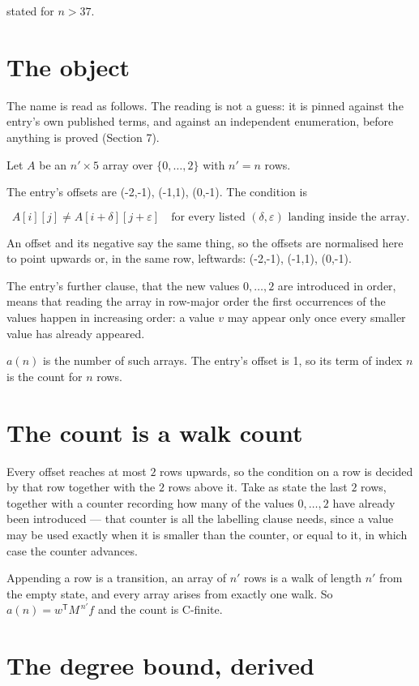 \documentclass[11pt]{article}
\theoremstyle{definition}
\begin{document}
stated for $n > 37$.

\section{The object}

The name is read as follows. The reading is not a guess: it is pinned against the entry's own published terms, and against an independent enumeration, before anything is proved (Section 7).

Let $A$ be an $n' \times 5$ array over $\{0,\dots,2\}$ with $n' = n$ rows.

The entry's offsets are (-2,-1), (-1,1), (0,-1). The condition is

\[A[i][j] \ne A[i{+}\delta][j{+}\varepsilon]\quad\text{for every listed }(\delta,\varepsilon)\text{ landing inside the array.}\]

An offset and its negative say the same thing, so the offsets are normalised here to point upwards or, in the same row, leftwards: (-2,-1), (-1,1), (0,-1).

The entry's further clause, that the new values $0,\dots,2$ are introduced in order, means that reading the array in row-major order the first occurrences of the values happen in increasing order: a value $v$ may appear only once every smaller value has already appeared.

$a(n)$ is the number of such arrays. The entry's offset is 1, so its term of index $n$ is the count for $n$ rows.

\section{The count is a walk count}

Every offset reaches at most $2$ rows upwards, so the condition on a row is decided by that row together with the $2$ rows above it. Take as state the last $2$ rows, together with a counter recording how many of the values $0,\dots,2$ have already been introduced --- that counter is all the labelling clause needs, since a value may be used exactly when it is smaller than the counter, or equal to it, in which case the counter advances.

Appending a row is a transition, an array of $n'$ rows is a walk of length $n'$ from the empty state, and every array arises from exactly one walk. So $a(n) = w^{\mathsf T}M^{\,n'}f$ and the count is C-finite.

\section{The degree bound, derived}
\end{document}
